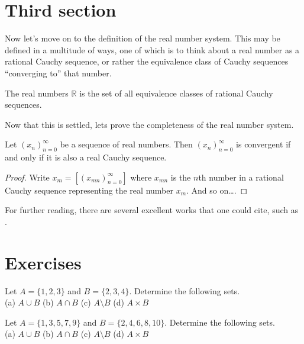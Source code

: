 \documentclass{tstextbook}
\begin{document}
	
	\section{Third section}
	
	Now let's move on to the definition of the real number system. This
	may be defined in a multitude of ways, one of which is to think about
	a real number as a rational Cauchy sequence, or rather the equivalence
	class of Cauchy sequences ``converging to'' that number.
	
	\begin{definition}
		\label{def:realnumbers}
		The real numbers $\mathbb{R}$ is the set of all equivalence classes
		of rational Cauchy sequences.
	\end{definition}
	
	Now that this is settled, lets prove the completeness of the real
	number system.
	
	\begin{theorem}
		\label{th:realnumberscomplete}
		Let $(x_n)_{n=0}^{\infty}$ be a sequence of real numbers.
		Then $(x_n)_{n=0}^{\infty}$ is convergent if and only if
		it is also a real Cauchy sequence.
	\end{theorem}
	\begin{proof}
		Write $x_m = [(x_{mn})_{n=0}^{\infty}]$ where
		$x_{mn}$ is the $n$th number in a rational Cauchy sequence
		representing the real number $x_m$. And so on\ldots.
	\end{proof}
	
	For further reading, there are several excellent works that one could
	cite, such as \cite{Tao2006,Turing1936}.
	
	\section*{Exercises}
	
	\begin{exercise}
		Let $A = \{1, 2, 3\}$ and $B = \{2, 3, 4\}$.
		Determine the following sets. \\
		(a) $A \cup B$ \quad
		(b) $A \cap B$ \quad
		(c) $A \setminus B$ \quad
		(d) $A \times B$
	\end{exercise}
	
	\begin{exercise}
		Let $A = \{1, 3, 5, 7, 9\}$ and $B = \{2, 4, 6, 8, 10\}$.
		Determine the following sets. \\
		(a) $A \cup B$ \quad
		(b) $A \cap B$ \quad
		(c) $A \setminus B$ \quad
		(d) $A \times B$
	\end{exercise}
	
\end{document}
